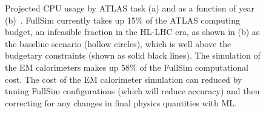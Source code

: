 \documentclass[letter, USenglish, 11pt, subfigure]{article}
\begin{document}
\begin{figure}[!htbp]
  \centering
  \caption{\label{fig:currentComputing} Projected CPU usage by ATLAS task (a) and as a function of year (b)~\cite{computingCDR}. FullSim currently takes up 15\% of the ATLAS computing budget, an infeasible fraction in the HL-LHC era, as shown in (b) as the baseline scenario (hollow circles), which is well above the budgetary constraints (shown as solid black lines). The simulation of the EM calorimeters makes up 58\% of the FullSim computational cost. The cost of the EM calorimeter simulation can reduced by tuning FullSim configurations (which will reduce accuracy) and then correcting for any changes in final physics quantities with ML.}
\end{figure}
\end{document}
